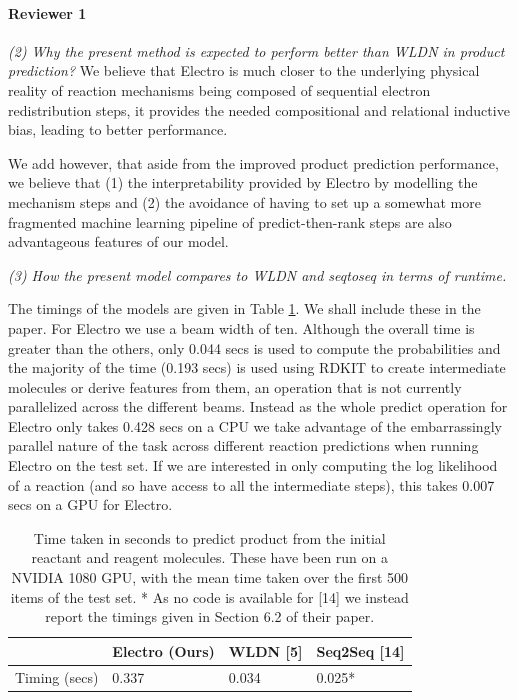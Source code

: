 \documentclass{article}
\begin{document}
\paragraph{Reviewer 1}

\emph{(2) Why the present method is expected to perform better than WLDN in product prediction?}
We believe that Electro is much closer to the underlying physical reality of reaction mechanisms being composed of sequential electron redistribution steps, it provides the needed compositional and relational inductive bias, leading to better performance.

We add however, that aside from the improved product prediction performance, we believe that  (1) the interpretability provided by Electro by modelling the mechanism steps and (2) the avoidance of having to set up a somewhat more fragmented machine learning pipeline of predict-then-rank steps are also advantageous features of our model.

\emph{(3) How the present model compares to WLDN and seqtoseq in terms of runtime.}


The timings of the models are given in Table \ref{table:timings}. We shall include these in the paper.
 For Electro we use a beam width of ten. 
 Although the overall time is greater than the others, only 0.044 secs is used to compute the probabilities and the majority of the time (0.193 secs) is used using RDKIT to create intermediate molecules or derive features from them, an operation that is not currently parallelized across the different beams. 
 Instead as the whole predict operation for Electro only takes 0.428 secs on a CPU we take advantage of the embarrassingly parallel nature of the task across different reaction predictions when running Electro on the test set.
 If we are interested in only computing the log likelihood of a reaction (and so have access to all the intermediate steps), this takes 0.007 secs on a GPU for Electro.
 
 
 

\begin{table}[h]
  \caption{Time taken in seconds to predict product from the initial reactant and reagent molecules.
  These have been run on a NVIDIA 1080 GPU, with the mean time taken over the first 500 items of the test set.
  * As no code is available for [14] we instead report the timings given in Section 6.2 of their paper.
  }
  \label{table:timings}
  \centering
  \begin{tabular}{llll}
    \toprule
    & Electro (Ours) & WLDN [5] & Seq2Seq [14]  \\
    \midrule
    Timing (secs) & 0.337   & 0.034 &  0.025*     \\
    \bottomrule
  \end{tabular}
\end{table}
\end{document}
